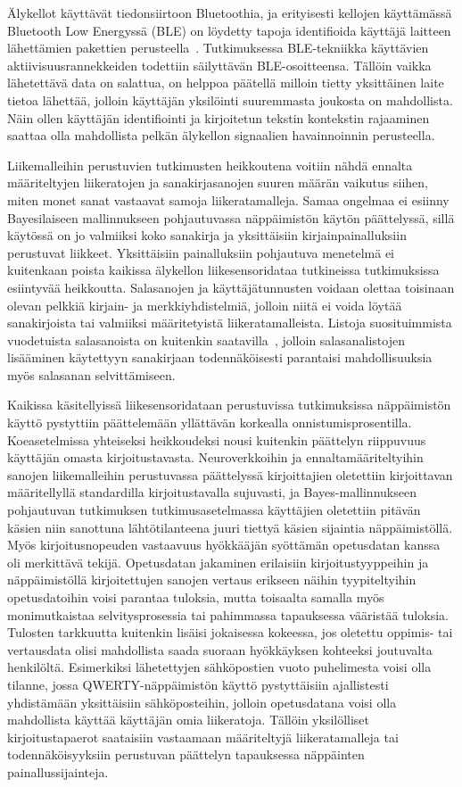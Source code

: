 \documentclass[finnish]{tktltiki2}
\theoremstyle{definition}
\theoremstyle{remark}
\begin{document}
Älykellot käyttävät tiedonsiirtoon Bluetoothia, ja erityisesti kellojen käyttämässä Bluetooth Low Energyssä (BLE) on löydetty tapoja identifioida  käyttäjä laitteen lähettämien pakettien perusteella~\cite{das}. Tutkimuksessa BLE-tekniikka käyttävien aktiivisuusrannekkeiden todettiin säilyttävän BLE-osoitteensa. Tällöin vaikka lähetettävä data on salattua, on helppoa päätellä milloin tietty yksittäinen laite tietoa lähettää, jolloin käyttäjän yksilöinti suuremmasta joukosta on mahdollista. Näin ollen käyttäjän identifiointi ja kirjoitetun tekstin kontekstin rajaaminen saattaa olla mahdollista pelkän älykellon signaalien havainnoinnin perusteella. 

Liikemalleihin perustuvien tutkimusten heikkoutena voitiin nähdä ennalta määriteltyjen liikeratojen ja sanakirjasanojen suuren määrän vaikutus siihen, miten monet sanat vastaavat samoja liikeratamalleja. Samaa ongelmaa ei esiinny Bayesilaiseen mallinnukseen pohjautuvassa näppäimistön käytön päättelyssä, sillä käytössä on jo valmiiksi koko sanakirja ja yksittäisiin kirjainpainalluksiin perustuvat liikkeet. Yksittäisiin painalluksiin pohjautuva menetelmä ei kuitenkaan poista kaikissa älykellon liikesensoridataa tutkineissa tutkimuksissa esiintyvää heikkoutta. Salasanojen ja käyttäjätunnusten voidaan olettaa toisinaan olevan pelkkiä kirjain- ja merkkiyhdistelmiä, jolloin niitä ei voida löytää sanakirjoista tai valmiiksi määritetyistä liikeratamalleista. Listoja suosituimmista vuodetuista salasanoista on kuitenkin saatavilla~\cite{pw}, jolloin salasanalistojen lisääminen käytettyyn sanakirjaan todennäköisesti parantaisi mahdollisuuksia myös salasanan selvittämiseen. 

Kaikissa käsitellyissä liikesensoridataan perustuvissa tutkimuksissa näppäimistön käyttö pystyttiin päättelemään yllättävän korkealla onnistumisprosentilla. Koeasetelmissa yhteiseksi heikkoudeksi nousi kuitenkin päättelyn riippuvuus käyttäjän omasta kirjoitustavasta. Neuroverkkoihin ja ennaltamääriteltyihin sanojen liikemalleihin perustuvassa päättelyssä kirjoittajien oletettiin kirjoittavan määritellyllä standardilla kirjoitustavalla sujuvasti, ja  Bayes-mallinnukseen pohjautuvan tutkimuksen tutkimusasetelmassa käyttäjien oletettiin pitävän käsien niin sanottuna lähtötilanteena juuri tiettyä käsien sijaintia näppäimistöllä. Myös kirjoitusnopeuden vastaavuus hyökkääjän syöttämän opetusdatan kanssa oli merkittävä tekijä.
Opetusdatan jakaminen erilaisiin kirjoitustyyppeihin ja näppäimistöllä kirjoitettujen sanojen vertaus erikseen näihin tyypiteltyihin opetusdatoihin voisi parantaa tuloksia, mutta toisaalta samalla myös monimutkaistaa selvitysprosessia tai pahimmassa tapauksessa vääristää tuloksia. Tulosten tarkkuutta kuitenkin lisäisi jokaisessa kokeessa, jos oletettu oppimis- tai vertausdata olisi mahdollista saada suoraan hyökkäyksen kohteeksi joutuvalta henkilöltä. Esimerkiksi lähetettyjen sähköpostien vuoto puhelimesta voisi olla tilanne, jossa QWERTY-näppäimistön käyttö pystyttäisiin ajallistesti yhdistämään yksittäisiin sähköposteihin, jolloin opetusdatana voisi olla mahdollista käyttää käyttäjän omia liikeratoja. Tällöin yksilölliset kirjoitustapaerot saataisiin vastaamaan määriteltyjä liikeratamalleja tai todennäköisyyksiin perustuvan päättelyn tapauksessa näppäinten painallussijainteja.
\end{document}
